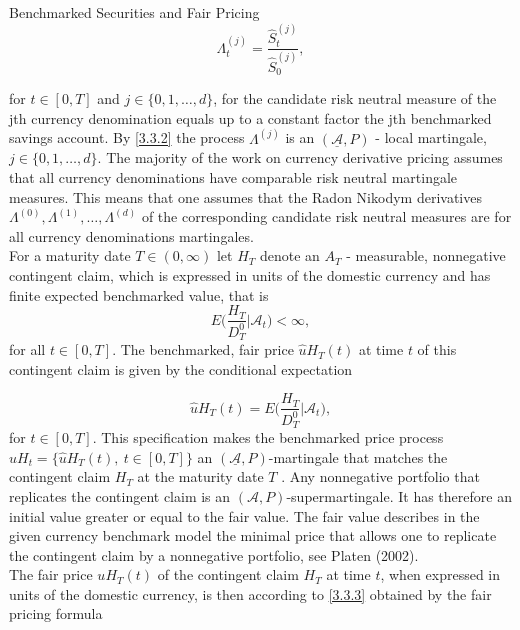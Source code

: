 \documentclass[unknownkeysallowed, compress]{beamer}
\theoremstyle{plain}
\begin{document}
\begin{frame}[allowframebreaks]{Benchmarked Securities and Fair Pricing}
\begin{equation}\label{3.3.5}
\Lambda_t^{(j)} = \frac{\hat{S}_t^{(j)}}{\hat{S}_0^{(j)}},
\end{equation}

for $t \in [0, T]$ and $j \in \{0, 1,\ldots, d\}$, for the candidate risk neutral measure of the
jth currency denomination equals up to a constant factor the jth benchmarked savings account. By \eqref{3.3.2} the process $\Lambda^{(j)}$ is an $(\mathcal{\underline{A}}, P)$ - local martingale, $j \in \{0, 1,\ldots,d\}$. The majority of the work on currency derivative pricing assumes that all currency denominations have comparable risk neutral martingale measures. %
This means that one assumes that the Radon Nikodym derivatives $\Lambda^{(0)}, \Lambda^{(1)},\ldots,\Lambda^{(d)}$ of the corresponding candidate risk neutral
measures are for all currency denominations martingales.\\
For a maturity date $T \in (0,\infty)$ let $H_T$ denote an
$A_T$ - measurable, nonnegative contingent claim, which is expressed in units of
the domestic currency and has finite expected benchmarked value, that is
\begin{equation}\label{3.3.6}
E\bigg(\frac{H_T}{D_T^0}\bigg|\mathcal{A}_t\bigg)<\infty,
\end{equation}
for all $t\in[0,T]$. The benchmarked, fair price $\hat{u}H_T(t)$ at time $t$ of this contingent claim is given by the conditional expectation

\begin{equation}\label{3.3.7}
\hat{u}H_T(t) = E\bigg(\frac{H_T}{D_T^0}\bigg|\mathcal{A}_t\bigg),
\end{equation}
for $t \in [0, T].$ This specification makes the benchmarked price process $\hat{u}H_t = \{\hat{u}H_T(t),~t\in[0,T]\}$  an $(\mathcal{\underline{A}}, P)$-martingale that matches the contingent claim $H_T$ at
the maturity date $T$ . Any nonnegative portfolio that replicates the contingent claim is %
 an $(\mathcal{A}, P)$-supermartingale. It has therefore
an initial value greater or equal to the fair value. The fair value describes in the
given currency benchmark model the minimal price that allows one to replicate
the contingent claim by a nonnegative portfolio, see Platen (2002).\\
The fair price $uH_T(t)$ of the contingent claim $H_T$ at time $t$, when expressed in units of the domestic currency, is then according to \eqref{3.3.3} obtained by the fair
pricing formula


\end{frame}
\end{document}
